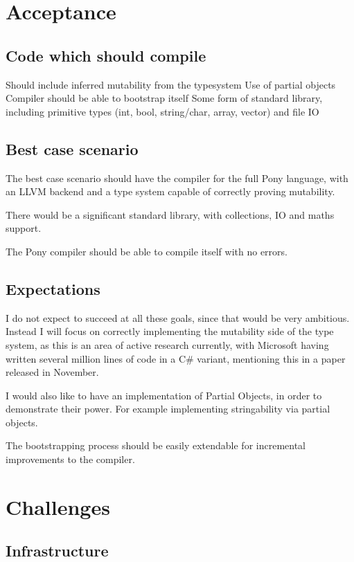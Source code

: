 \documentclass{article}
\begin{document}
\section{Acceptance}

\subsection{Code which should compile}

Should include inferred mutability from the typesystem
Use of partial objects
Compiler should be able to bootstrap itself
Some form of standard library, including primitive types (int, bool, string/char, array, vector) and file IO

\subsection{Best case scenario}

The best case scenario should have the compiler for the full Pony language, with an LLVM backend and a type system capable of correctly proving
mutability.

There would be a significant standard library, with collections, IO and maths support.

The Pony compiler should be able to compile itself with no errors.

\subsection{Expectations}

I do not expect to succeed at all these goals, since that would be very ambitious. Instead I will focus on correctly implementing the mutability side of the type system, as this is an area of active research currently, with Microsoft having written several million lines of code in a C\# variant, mentioning this in a paper released in November.

I would also like to have an implementation of Partial Objects, in order to demonstrate their power. For example implementing stringability via partial objects.

The bootstrapping process should be easily extendable for incremental improvements to the compiler. 

\section{Challenges}

\subsection{Infrastructure}
\end{document}
